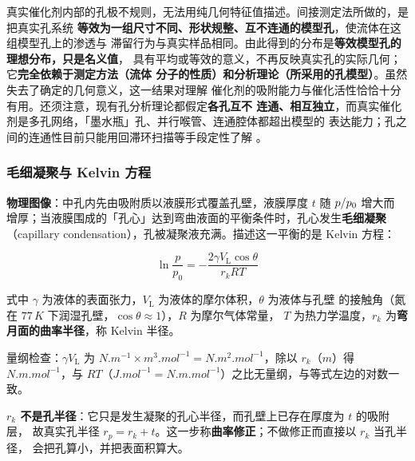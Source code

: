 真实催化剂内部的孔极不规则，无法用纯几何特征值描述。间接测定法所做的，是把真实孔系统
\textbf{等效为一组尺寸不同、形状规整、互不连通的模型孔}，使流体在这组模型孔上的渗透与
滞留行为与真实样品相同。由此得到的分布是\textbf{等效模型孔的理想分布，只是名义值}，
具有平均或等效的意义，不再反映真实孔的实际几何；它\textbf{完全依赖于测定方法（流体
分子的性质）和分析理论（所采用的孔模型）}。虽然失去了确定的几何意义，这一结果对理解
催化剂的吸附能力与催化活性恰恰十分有用。还须注意，现有孔分析理论都假定\textbf{各孔互不
连通、相互独立}，而真实催化剂是多孔网络，「墨水瓶」孔、并行喉管、连通腔体都超出模型的
表达能力；孔之间的连通性目前只能用回滞环扫描等手段定性了解
。

\subsubsection{毛细凝聚与 Kelvin 方程}

\begin{principle}
\textbf{物理图像}：中孔内先由吸附质以液膜形式覆盖孔壁，液膜厚度 $t$ 随 $p/p_{0}$ 增大而
增厚；当液膜围成的「孔心」达到弯曲液面的平衡条件时，孔心发生\textbf{毛细凝聚}
（capillary condensation），孔被凝聚液充满。描述这一平衡的是 Kelvin 方程：

\begin{equation}\label{eq:kelvin}
\ln\frac{p}{p_0}=-\frac{2\gamma V_{\mathrm{L}}\cos\theta}{r_kRT}
\end{equation}

式中 $\gamma$ 为液体的表面张力，$V_{\mathrm{L}}$ 为液体的摩尔体积，$\theta$ 为液体与孔壁
的接触角（氮在 $77\,\unit{K}$ 下润湿孔壁，$\cos\theta\approx1$），$R$ 为摩尔气体常量，
$T$ 为热力学温度，$r_k$ 为\textbf{弯月面的曲率半径}，称 Kelvin 半径。

量纲检查：$\gamma V_{\mathrm{L}}$ 为 $\unit{N.m^{-1}}\times\unit{m^3.mol^{-1}}
=\unit{N.m^2.mol^{-1}}$，除以 $r_k$（$\unit{m}$）得 $\unit{N.m.mol^{-1}}$，与
$RT$（$\unit{J.mol^{-1}}=\unit{N.m.mol^{-1}}$）之比无量纲，与等式左边的对数一致。

\textbf{$r_k$ 不是孔半径}：它只是发生凝聚的孔心半径，而孔壁上已存在厚度为 $t$ 的吸附层，
故真实孔半径 $r_p=r_k+t$。这一步称\textbf{曲率修正}；不做修正而直接以 $r_k$ 当孔半径，
会把孔算小，并把表面积算大。
\end{principle}

